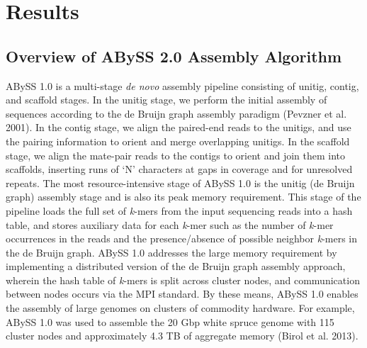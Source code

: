 \documentclass[
  12pt,
  oneside,
  openany]{book}
\begin{document}
\hypertarget{results}{%
\section{Results}\label{results}}

\hypertarget{overview-of-abyss-2.0-assembly-algorithm}{%
\subsection{Overview of ABySS 2.0 Assembly Algorithm}\label{overview-of-abyss-2.0-assembly-algorithm}}

ABySS 1.0 is a multi-stage \emph{de novo} assembly pipeline consisting of unitig, contig, and scaffold stages. In the unitig stage, we perform the initial assembly of sequences according to the de Bruijn graph assembly paradigm (Pevzner et al. 2001). In the contig stage, we align the paired-end reads to the unitigs, and use the pairing information to orient and merge overlapping unitigs. In the scaffold stage, we align the mate-pair reads to the contigs to orient and join them into scaffolds, inserting runs of `N' characters at gaps in coverage and for unresolved repeats. The most resource-intensive stage of ABySS 1.0 is the unitig (de Bruijn graph) assembly stage and is also its peak memory requirement. This stage of the pipeline loads the full set of \emph{k}-mers from the input sequencing reads into a hash table, and stores auxiliary data for each \emph{k}-mer such as the number of \emph{k}-mer occurrences in the reads and the presence/absence of possible neighbor \emph{k}-mers in the de Bruijn graph. ABySS 1.0 addresses the large memory requirement by implementing a distributed version of the de Bruijn graph assembly approach, wherein the hash table of \emph{k}-mers is split across cluster nodes, and communication between nodes occurs via the MPI standard. By these means, ABySS 1.0 enables the assembly of large genomes on clusters of commodity hardware. For example, ABySS 1.0 was used to assemble the 20 Gbp white spruce genome with 115 cluster nodes and approximately 4.3 TB of aggregate memory (Birol et al. 2013).
\end{document}
